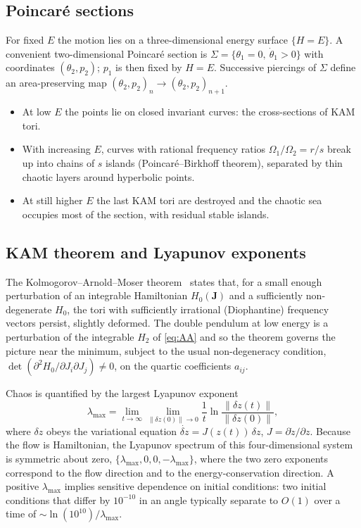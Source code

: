 \documentclass[11pt,a4paper]{book}
\theoremstyle{definition}
\theoremstyle{remark}
\begin{document}
\subsection{Poincar\'e sections}

For fixed $E$ the motion lies on a three-dimensional energy surface $\{H=E\}$. A convenient two-dimensional Poincar\'e
section is $\Sigma=\{\theta_1=0,\ \dot\theta_1>0\}$ with coordinates $(\theta_2,p_2)$; $p_1$ is then fixed by
$H=E$. Successive piercings of $\Sigma$ define an area-preserving map $(\theta_2,p_2)_n\to(\theta_2,p_2)_{n+1}$.
\begin{itemize}
  \item At low $E$ the points lie on closed invariant curves: the cross-sections of KAM tori.
  \item With increasing $E$, curves with rational frequency ratios $\Omega_1/\Omega_2=r/s$ break up into chains of
        $s$ islands (Poincar\'e--Birkhoff theorem), separated by thin chaotic layers around hyperbolic points.
  \item At still higher $E$ the last KAM tori are destroyed and the chaotic sea occupies most of the section, with
        residual stable islands.
\end{itemize}

\subsection{KAM theorem and Lyapunov exponents}

The Kolmogorov--Arnold--Moser theorem~\cite{kolmogorov,arnoldkam,moser} states that, for a small enough perturbation of an integrable Hamiltonian
$H_0(\bm J)$ and a sufficiently non-degenerate $H_0$, the tori with sufficiently irrational (Diophantine) frequency
vectors persist, slightly deformed. The double pendulum at low energy is a perturbation of the integrable
$H_2$ of \eqref{eq:AA} and so the theorem governs the picture near the minimum, subject to the usual non-degeneracy
condition, $\det(\partial^2H_0/\partial J_i\partial J_j)\ne0$, on the quartic coefficients $a_{ij}$.

Chaos is quantified by the largest Lyapunov exponent~\cite{benettin}
\begin{equation}
  \lambda_{\max}=\lim_{t\to\infty}\lim_{\|\delta z(0)\|\to0}\frac1t\ln\frac{\|\delta z(t)\|}{\|\delta z(0)\|},
\end{equation}
where $\delta z$ obeys the variational equation $\dot{\delta z}=J(z(t))\,\delta z$, $J=\partial\dot z/\partial z$.
Because the flow is Hamiltonian, the Lyapunov spectrum of this four-dimensional system is symmetric about zero,
$\{\lambda_{\max},0,0,-\lambda_{\max}\}$, where the two zero exponents correspond to the flow direction and to the
energy-conservation direction. A positive $\lambda_{\max}$ implies
sensitive dependence on initial conditions: two initial conditions that differ by $10^{-10}$ in an angle typically
separate to $O(1)$ over a time of $\sim\ln(10^{10})/\lambda_{\max}$.
\end{document}

